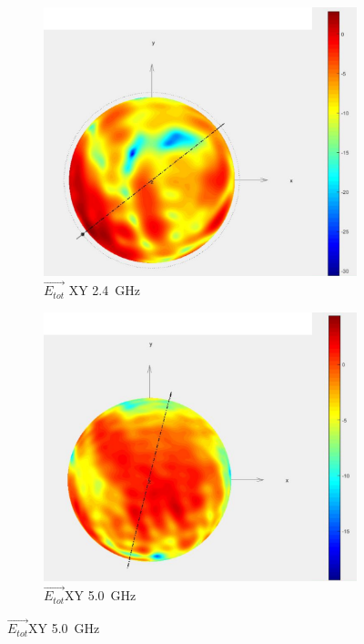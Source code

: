 \begin{figure}[h!]
	\centering
	\begin{subfigure}[t]{0.35\textwidth}
		\begin{center}
			\includegraphics[width=1\textwidth]{../fig/plt/star_lab_2ghz4_xy_reduced.png}
			\caption{$\vec{E_{tot}}$ XY \SI{2.4}{\giga\hertz}}
		\end{center}
	\end{subfigure}
	\begin{subfigure}[t]{0.35\textwidth}
		\begin{center}
			\includegraphics[width=1\textwidth]{../fig/plt/star_lab_5ghz0_xy_reduced.png}
			\caption{$\vec{E_{tot}}$XY \SI{5.0}{\giga\hertz}}
		\end{center}
	\end{subfigure}
	

\end{figure}
